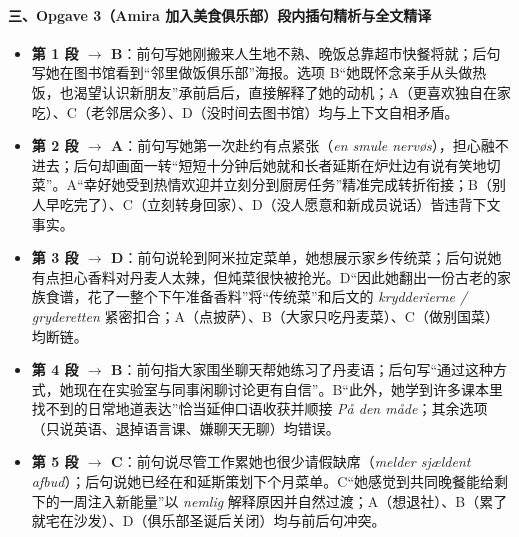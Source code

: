 \paragraph*{三、Opgave 3（Amira 加入美食俱乐部）段内插句精析与全文精译}
\begin{itemize}
  \item \textbf{第 1 段 $\rightarrow$ B}：前句写她刚搬来人生地不熟、晚饭总靠超市快餐将就；后句写她在图书馆看到“邻里做饭俱乐部”海报。选项 B“她既怀念亲手从头做热饭，也渴望认识新朋友”承前启后，直接解释了她的动机；A（更喜欢独自在家吃）、C（老邻居众多）、D（没时间去图书馆）均与上下文自相矛盾。
  \item \textbf{第 2 段 $\rightarrow$ A}：前句写她第一次赴约有点紧张（\textit{en smule nervøs}），担心融不进去；后句却画面一转“短短十分钟后她就和长者延斯在炉灶边有说有笑地切菜”。A“幸好她受到热情欢迎并立刻分到厨房任务”精准完成转折衔接；B（别人早吃完了）、C（立刻转身回家）、D（没人愿意和新成员说话）皆违背下文事实。
  \item \textbf{第 3 段 $\rightarrow$ D}：前句说轮到阿米拉定菜单，她想展示家乡传统菜；后句说她有点担心香料对丹麦人太辣，但炖菜很快被抢光。D“因此她翻出一份古老的家族食谱，花了一整个下午准备香料”将“传统菜”和后文的 \textit{krydderierne / gryderetten} 紧密扣合；A（点披萨）、B（大家只吃丹麦菜）、C（做别国菜）均断链。
  \item \textbf{第 4 段 $\rightarrow$ B}：前句指大家围坐聊天帮她练习了丹麦语；后句写“通过这种方式，她现在在实验室与同事闲聊讨论更有自信”。B“此外，她学到许多课本里找不到的日常地道表达”恰当延伸口语收获并顺接 \textit{På den måde}；其余选项（只说英语、退掉语言课、嫌聊天无聊）均错误。
  \item \textbf{第 5 段 $\rightarrow$ C}：前句说尽管工作累她也很少请假缺席（\textit{melder sjældent afbud}）；后句说她已经在和延斯策划下个月菜单。C“她感觉到共同晚餐能给剩下的一周注入新能量”以 \textit{nemlig} 解释原因并自然过渡；A（想退社）、B（累了就宅在沙发）、D（俱乐部圣诞后关闭）均与前后句冲突。
\end{itemize}

